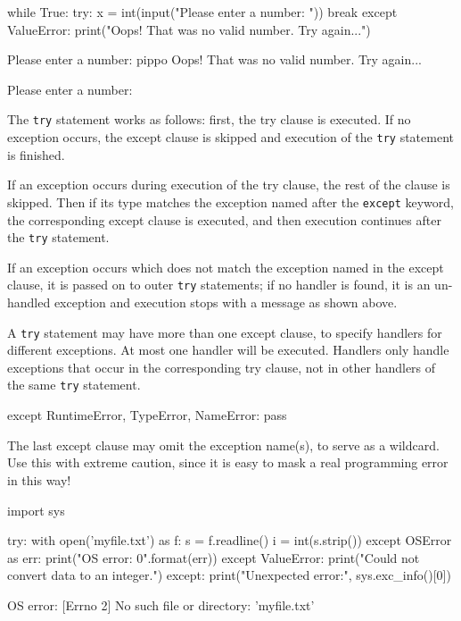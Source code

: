 \begin{ipython}
while True: 
    try:
        x = int(input("Please enter a number: ")) 
        break
    except ValueError:
        print("Oops! That was no valid number. Try again...")
\end{ipython}
\begin{ioutput}
Please enter a number: pippo
Oops!  That was no valid number.  Try again...

Please enter a number:
\end{ioutput}

The \texttt{try} statement works as follows: first, the try clause is executed. If no exception occurs, the except clause is skipped and execution of the \texttt{try} statement is finished.

If an exception occurs during execution of the try clause, the rest of the clause is skipped. Then if its type matches the exception named after the \texttt{except} keyword, the corresponding except clause is executed, and then execution continues after the \texttt{try} statement.

If an exception occurs which does not match the exception named in the except clause, it is passed on to outer \texttt{try} statements; if no handler is found, it is an un-handled exception and execution stops with a message as shown above.

A \texttt{try} statement may have more than one except clause, to specify handlers for different exceptions. At most one handler will be executed. Handlers only handle exceptions that occur in the corresponding try clause, not in other handlers of the same \texttt{try} statement.

\begin{ipython}
    except RuntimeError, TypeError, NameError:
        pass	
\end{ipython}

The last except clause may omit the exception name(s), to serve as a wildcard. Use this with extreme caution, since it is easy to mask a real programming error in this way! 

\begin{ipython}
import sys 

try:
    with open('myfile.txt') as f: 
        s = f.readline()
        i = int(s.strip()) 
except OSError as err:
    print("OS error: {0}".format(err)) 
except ValueError:
    print("Could not convert data to an integer.") 
except:
    print("Unexpected error:", sys.exc_info()[0])
\end{ipython}
\begin{ioutput}
OS error: [Errno 2] No such file or directory: 'myfile.txt'	
\end{ioutput}

